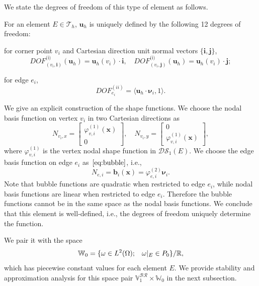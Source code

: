 We state the degrees of freedom of this type of element as follows.
\begin{defn}\label{lem:unisolvence}
		  For an element $E\in \mathcal{T}_h$, $\mathbf{u}_h$ is uniquely defined
		  by the following 12 degrees of freedom:

		   for corner point $v_i$ and Cartesian direction unit normal vectors $\{\mathbf{i},\mathbf{j}\}$,
		  \begin{equation*}
					 DOF^{\text{(i)}}_{(v_i,\mathbf{i})}(\mathbf{u}_h) = \mathbf{u}_h(v_i)\cdot \mathbf{i}, 
					 \quad DOF^{\text{(i)}}_{(v_i,\mathbf{j})}(\mathbf{u}_h) = \mathbf{u}_h(v_i)\cdot \mathbf{j};
		  \end{equation*}

		  for edge $e_i$,
		  \begin{equation*}
					 DOF^{(ii)}_{e_i} = \langle \mathbf{u}_h \cdot \pmb{\nu}_i, 1 \rangle.
		  \end{equation*}
\end{defn}
We give an explicit construction of the shape functions. 
We choose the nodal basis function on vertex $v_i$ in two Cartesian directions as
		  \begin{equation}
					 N_{v_i,x} = \begin{bmatrix}
								\varphi^{(1)}_{v,i}(\mathbf{x})\\
								0
					 \end{bmatrix}, \quad  N_{v_i,y} = \begin{bmatrix}
								0\\
								\varphi^{(1)}_{v,i}(\mathbf{x})
					 \end{bmatrix},
		  \end{equation}
where $\varphi^{(1)}_{v,i}$ is the vertex nodal shape function in $\mathcal{DS}_1(E)$.
We choose the edge basis function on edge $e_i$ as~$\eqref{eq:bubble}$, i.e.,
\begin{equation}
		  N_{e,i} = \mathbf{b}_i(\mathbf{x}) = \varphi^{(2)}_{e,i}\pmb{\nu}_i.
\end{equation}
Note that bubble functions are quadratic when restricted to edge $e_i$, while
nodal basis functions are linear when restricted to edge $e_i$. Therefore 
the bubble
functions cannot be in the same space as the nodal basis functions.
We conclude
that this element is well-defined, i.e., the degrees of freedom uniquely 
determine the function.

We pair it with the space 
\begin{equation}
\mathbb{W}_0 = \{\omega \in L^2(\Omega); \hspace{0.3cm} \omega|_E \in P_0 \} /\mathbb{R},
\end{equation}
which has piecewise constant values for each element $E$.
We provide stability and approximation analysis for this space pair $\mathbb{V}_1^{\mathcal{BR}} \times \mathbb{W}_0$
in the next subsection.

